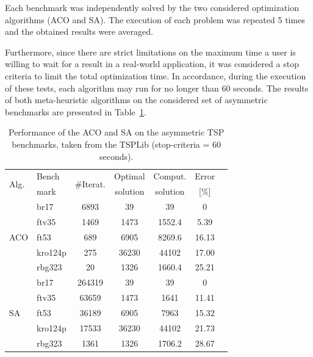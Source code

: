 \documentclass[onecolumn]{elsarticle}
\begin{document}
Each benchmark was independently solved by the two considered optimization algorithms (ACO and SA). The execution of each problem was repeated 5 times and the obtained results were averaged.  

Furthermore, since there are strict limitations on the maximum time a user is willing to wait for a result in a real-world application, it was considered a stop criteria to limit the total optimization time. In accordance, during the execution of these tests, each algorithm may run for no longer than 60 seconds. The results of both meta-heuristic algorithms on the considered set of asymmetric benchmarks are presented in Table~\ref{tab:tsp_results}. 

\begin{table}
    \centering
    \caption{Performance of the ACO and SA on the asymmetric TSP benchmarks, taken from the TSPLib (stop-criteria = 60 seconds). }
    \label{tab:tsp_results}
    \begin{tabular}{@{}l l c c c c c@{}}
    \hline
    \multirow{2}{*}{Alg.}& Bench   & \multirow{2}{*}{\#Iterat.}  & Optimal  & Comput.  & Error  \\ 
                         & mark    &                             & solution & solution &  [\%]  \\ \hline
    \multirow{5}{*}{ACO} & br17    & 6893    & 39        & 39       & 0              \\  
                         & ftv35   & 1469    & 1473      & 1552.4   & 5.39         \\  
                         & ft53    & 689     & 6905      & 8269.6   & 16.13        \\ 
                         & kro124p  & 275     & 36230     & 44102    & 17.00         \\   
                         & rbg323  & 20      & 1326      & 1660.4   & 25.21      \\ \hline
    \multirow{5}{*}{SA}  & br17    & 264319  & 39        & 39       & 0               \\  
                         & ftv35   & 63659   & 1473      & 1641		& 11.41       \\  
                         & ft53    & 36189   & 6905      & 7963     & 15.32        \\  
                         & kro124p  & 17533    & 36230     & 44102   & 21.73      \\  
                         & rbg323  & 1361    & 1326      & 1706.2   & 28.67        \\ \hline
    \end{tabular}
\end{table}
\end{document}

